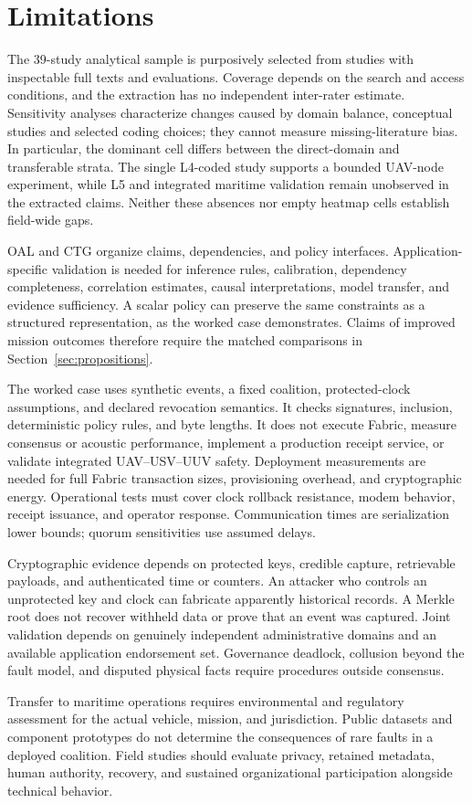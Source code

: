 \section{Limitations}\label{sec:limitations}

The 39-study analytical sample is purposively selected from studies with inspectable full texts and evaluations. Coverage depends on the search and access conditions, and the extraction has no independent inter-rater estimate. Sensitivity analyses characterize changes caused by domain balance, conceptual studies and selected coding choices; they cannot measure missing-literature bias. In particular, the dominant cell differs between the direct-domain and transferable strata. The single L4-coded study supports a bounded UAV-node experiment, while L5 and integrated maritime validation remain unobserved in the extracted claims. Neither these absences nor empty heatmap cells establish field-wide gaps.

OAL and CTG organize claims, dependencies, and policy interfaces. Application-specific validation is needed for inference rules, calibration, dependency completeness, correlation estimates, causal interpretations, model transfer, and evidence sufficiency. A scalar policy can preserve the same constraints as a structured representation, as the worked case demonstrates. Claims of improved mission outcomes therefore require the matched comparisons in Section~\ref{sec:propositions}.

The worked case uses synthetic events, a fixed coalition, protected-clock assumptions, and declared revocation semantics. It checks signatures, inclusion, deterministic policy rules, and byte lengths. It does not execute Fabric, measure consensus or acoustic performance, implement a production receipt service, or validate integrated UAV--USV--UUV safety. Deployment measurements are needed for full Fabric transaction sizes, provisioning overhead, and cryptographic energy. Operational tests must cover clock rollback resistance, modem behavior, receipt issuance, and operator response. Communication times are serialization lower bounds; quorum sensitivities use assumed delays.

Cryptographic evidence depends on protected keys, credible capture, retrievable payloads, and authenticated time or counters. An attacker who controls an unprotected key and clock can fabricate apparently historical records. A Merkle root does not recover withheld data or prove that an event was captured. Joint validation depends on genuinely independent administrative domains and an available application endorsement set. Governance deadlock, collusion beyond the fault model, and disputed physical facts require procedures outside consensus.

Transfer to maritime operations requires environmental and regulatory assessment for the actual vehicle, mission, and jurisdiction. Public datasets and component prototypes do not determine the consequences of rare faults in a deployed coalition. Field studies should evaluate privacy, retained metadata, human authority, recovery, and sustained organizational participation alongside technical behavior.
